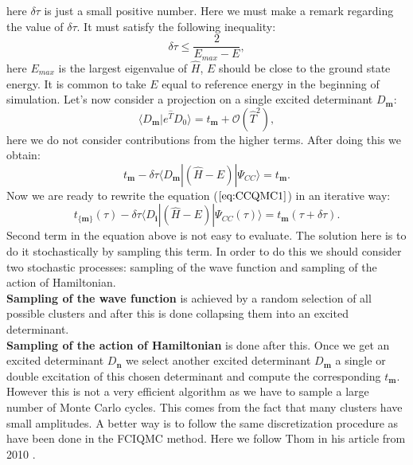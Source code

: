 \documentclass[twoside,english]{uiofysmaster}
\theoremstyle{definition}
\begin{document}
here $\delta \tau$ is just a small positive number. 
Here we must make a remark regarding the value of $\delta \tau$. It must satisfy the following inequality:
\begin{equation}
\delta \tau \leq \frac{2}{E_{max} - E},
\end{equation}
here $E_{max}$ is the largest eigenvalue of $\hat{H}$, $E$ should be close to the ground state energy. It is common to take $E$ equal to reference energy in the beginning of simulation.
Let's now consider a projection on a single excited determinant $D_{\boldsymbol{m}}$:
\begin{equation}
\langle D_{\boldsymbol{m}}|e^{\hat{T}}D_0\rangle = t_{\boldsymbol{m}} + \mathcal{O}(\hat{T}^2),
\end{equation}
here we  do not consider contributions from the higher terms. After doing this we obtain: 
\begin{equation}\label{CCbf2}
t_{\boldsymbol{m}} - \delta \tau \langle D_{\boldsymbol{m}}|(\hat{H}-E)|\Psi_{CC}\rangle = t_{\boldsymbol{m}}.
\end{equation}
Now we are ready to rewrite the equation ($\ref{eq:CCQMC1}$) in an iterative way:
\begin{equation}\label{eq:CCiter}
 t_{\{\boldsymbol{m}\}}(\tau) - \delta \tau \langle D_{\boldsymbol{i}}|(\hat{H}-E)|\Psi_{CC}(\tau)\rangle = t_{\boldsymbol{m}}(\tau + \delta \tau).
\end{equation}
Second term in the equation above is not easy to evaluate. The solution here is to do it stochastically by sampling this term. In order to do this we should consider two stochastic processes: sampling of the wave function and sampling of the action of Hamiltonian.\\
\textbf{Sampling of the wave function} is achieved by a random selection of all possible clusters and after this is done collapsing them into an excited determinant.\\
\textbf{Sampling of the action of Hamiltonian} is done after this. Once we get an excited determinant $D_\textbf{n}$ we select another excited determinant $D_\textbf{m}$ a single or double excitation of this chosen determinant and compute the corresponding $t_\textbf{m}$. However this is not a very efficient algorithm as we have to sample a large number of Monte Carlo cycles. This comes from the fact that many clusters have small amplitudes. A better way is to follow the same discretization procedure as have been done in the FCIQMC method. Here we follow Thom in his article from 2010 \cite{thomStochasticCoupledCluster2010}. \\ 
\end{document}
